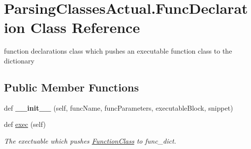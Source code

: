 \hypertarget{class_parsing_classes_actual_1_1_func_declaration}{}\section{Parsing\+Classes\+Actual.\+Func\+Declaration Class Reference}
\label{class_parsing_classes_actual_1_1_func_declaration}


function declarations class which pushes an executable function class to the dictionary  


\subsection*{Public Member Functions}
\begin{DoxyCompactItemize}
\item 
def {\bfseries \+\_\+\+\_\+init\+\_\+\+\_\+} (self, func\+Name, func\+Parameters, executable\+Block, snippet)\hypertarget{class_parsing_classes_actual_1_1_func_declaration_a43ab858437296fcce5eafd0c096c248b}{}\label{class_parsing_classes_actual_1_1_func_declaration_a43ab858437296fcce5eafd0c096c248b}

\item 
def \hyperlink{class_parsing_classes_actual_1_1_func_declaration_a6dc7388f45583a800ceb973146069b7c}{exec} (self)\hypertarget{class_parsing_classes_actual_1_1_func_declaration_a6dc7388f45583a800ceb973146069b7c}{}\label{class_parsing_classes_actual_1_1_func_declaration_a6dc7388f45583a800ceb973146069b7c}

\begin{DoxyCompactList}\small\item\em The exectuable which pushes \hyperlink{class_parsing_classes_actual_1_1_function_class}{Function\+Class} to func\+\_\+dict. \end{DoxyCompactList}\end{DoxyCompactItemize}
